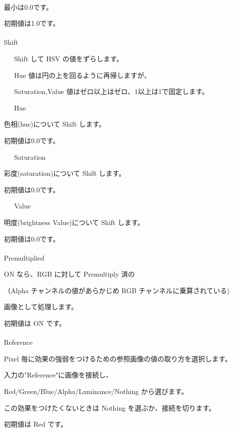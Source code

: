 \documentclass[a4paper,12pt]{article}
\begin{document}
\newpage

\thispagestyle{empty}

\ \vspace{-0.2em}
\par
最小は0.0です。\par
初期値は1.0です。\\
\\
Shift\par
\noindent \ \ \, Shift して HSV の値をずらします。\par
\noindent \ \ \, Hue 値は円の上を回るように再帰しますが、\par
\noindent \ \ \, Saturation,Value 値はゼロ以上はゼロ、1以上は1で固定します。\\
\par
\noindent \ \ \, Hue\par
色相(hue)について Shift します。\par
初期値は0.0です。\par
\noindent \ \ \, Saturation\par
彩度(saturation)について Shift します。\par
初期値は0.0です。\par
\noindent \ \ \, Value\par
明度(brightness Value)について Shift します。\par
初期値は0.0です。\\
\\
Premultiplied\par
ON なら、RGB に対して Premultiply 済の\par
（Alpha チャンネルの値があらかじめ RGB チャンネルに乗算されている)\par
画像として処理します。\par
初期値は ON です。\\
\\
Reference\par
Pixel 毎に効果の強弱をつけるための参照画像の値の取り方を選択します。\par
入力の"Reference"に画像を接続し、\par
Red/Green/Blue/Alpha/Luminance/Nothing から選びます。\par
この効果をつけたくないときは Nothing を選ぶか、接続を切ります。\par
初期値は Red です。
\end{document}
